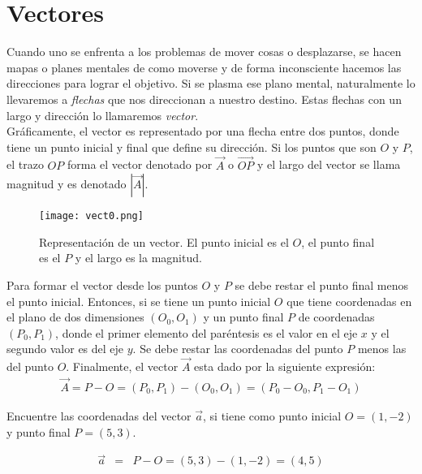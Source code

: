 \section{Vectores}

Cuando uno se enfrenta a los problemas de mover cosas o desplazarse, se hacen mapas o planes mentales de como moverse y de forma inconsciente hacemos las direcciones para lograr el objetivo. Si se plasma ese plano mental, naturalmente lo llevaremos a \textit{flechas} que nos direccionan a nuestro destino. Estas flechas con un largo y dirección lo llamaremos \textit{vector}.\\

Gráficamente, el vector es representado por una flecha entre dos puntos, donde tiene un punto inicial y final que define su dirección. Si los puntos que son $O$ y $P$, el trazo $OP$ forma el vector denotado por $\vec{A}$ o $\vec{OP}$ y el largo del vector se llama magnitud y es denotado $|\vec{A}|$.\\

 \begin{center}
\begin{figure}[h!]
\centering
\texttt{[image: vect0.png]}
\caption[Representación de un vector.]{Representación de un vector. El punto inicial es el $O$, el punto final es el $P$ y el largo es la magnitud.} \label{vect0}
\end{figure}
\end{center}

Para formar el vector desde los puntos $O$ y $P$ se debe restar el punto final menos el punto inicial. Entonces, si se tiene un punto inicial $O$ que tiene coordenadas en el plano de dos dimensiones $(O_{0},O_{1})$ y un punto final $P$ de coordenadas $(P_{0}, P_{1})$, donde el primer elemento del paréntesis es el valor en el eje $x$ y el segundo valor es del eje $y$. Se debe restar las coordenadas del punto $P$ menos las del punto $O$. Finalmente, el vector $\vec{A}$ esta dado por la siguiente expresión:
\begin{eqnarray}
\vec{A}=P-O=(P_{0}, P_{1})-(O_{0},O_{1})=(P_{0}-O_{0}, P_{1}-O_{1})
\end{eqnarray}

\begin{myexample}
Encuentre las coordenadas del vector $\vec{a}$, si tiene como punto inicial $O=(1,-2)$ y punto final $P=(5,3)$.
\end{myexample}
\begin{eqnarray*}
\vec{a}&=& P-O = (5,3)-(1,-2)= (4,5)
\end{eqnarray*}

